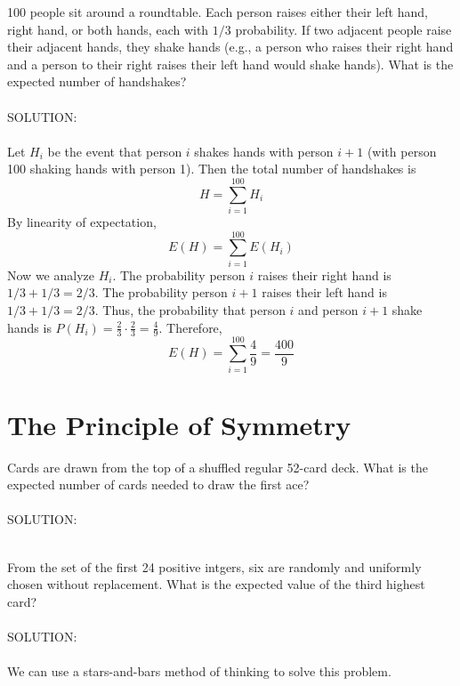 \documentclass[12pt]{book}
\begin{document}
\begin{propc}
    100 people sit around a roundtable. Each person raises either their left hand, right hand, or both hands, each with $1/3$ probability. If two adjacent people raise their adjacent hands, they shake hands (e.g., a person who raises their right hand and a person to their right raises their left hand would shake hands). What is the expected number of handshakes? \\\\
    SOLUTION\@: \\\\
    Let $H_i$ be the event that person $i$ shakes hands with person $i+1$ (with person 100 shaking hands with person 1). Then the total number of handshakes is \[H=\sum_{i=1}^{100}H_i\] By linearity of expectation, \[E(H)=\sum_{i=1}^{100}E(H_i)\] Now we analyze $H_i$. The probability person $i$ raises their right hand is $1/3 + 1/3 = 2/3$. The probability person $i+1$ raises their left hand is $1/3 + 1/3 = 2/3$. Thus, the probability that person $i$ and person $i+1$ shake hands is $P(H_i)=\frac{2}{3}\cdot\frac{2}{3}=\frac{4}{9}$. Therefore, \[E(H)=\sum_{i=1}^{100}\frac{4}{9}=\boxed{\frac{400}{9}}\]
    
\end{propc}

\section{The Principle of Symmetry}

\begin{propc}
    Cards are drawn from the top of a shuffled regular 52-card deck. What is the expected number of cards needed to draw the first ace? \\\\
    SOLUTION\@: \\\\
    
\end{propc}

\begin{propc}
    From the set of the first 24 positive intgers, six are randomly and uniformly chosen without replacement. What is the expected value of the third highest card? \\\\
    SOLUTION\@: \\\\
    We can use a stars-and-bars method of thinking to solve this problem. 
    
    
\end{propc}
\end{document}
